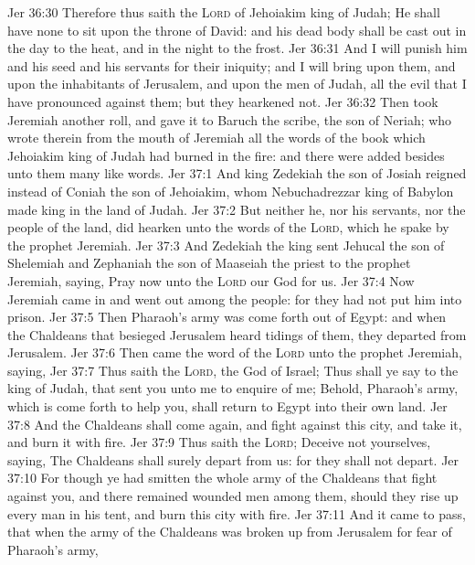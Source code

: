 \vs Jer 36:30 Therefore thus saith the \textsc{Lord} of Jehoiakim king of Judah; He shall have none to sit upon the throne of David: and his dead body shall be cast out in the day to the heat, and in the night to the frost.
\vs Jer 36:31 And I will punish him and his seed and his servants for their iniquity; and I will bring upon them, and upon the inhabitants of Jerusalem, and upon the men of Judah, all the evil that I have pronounced against them; but they hearkened not.
\vs Jer 36:32 Then took Jeremiah another roll, and gave it to Baruch the scribe, the son of Neriah; who wrote therein from the mouth of Jeremiah all the words of the book which Jehoiakim king of Judah had burned in the fire: and there were added besides unto them many like words.
\vs Jer 37:1 And king Zedekiah the son of Josiah reigned instead of Coniah the son of Jehoiakim, whom Nebuchadrezzar king of Babylon made king in the land of Judah.
\vs Jer 37:2 But neither he, nor his servants, nor the people of the land, did hearken unto the words of the \textsc{Lord}, which he spake by the prophet Jeremiah.
\vs Jer 37:3 And Zedekiah the king sent Jehucal the son of Shelemiah and Zephaniah the son of Maaseiah the priest to the prophet Jeremiah, saying, Pray now unto the \textsc{Lord} our God for us.
\vs Jer 37:4 Now Jeremiah came in and went out among the people: for they had not put him into prison.
\vs Jer 37:5 Then Pharaoh's army was come forth out of Egypt: and when the Chaldeans that besieged Jerusalem heard tidings of them, they departed from Jerusalem.
\vs Jer 37:6 Then came the word of the \textsc{Lord} unto the prophet Jeremiah, saying,
\vs Jer 37:7 Thus saith the \textsc{Lord}, the God of Israel; Thus shall ye say to the king of Judah, that sent you unto me to enquire of me; Behold, Pharaoh's army, which is come forth to help you, shall return to Egypt into their own land.
\vs Jer 37:8 And the Chaldeans shall come again, and fight against this city, and take it, and burn it with fire.
\vs Jer 37:9 Thus saith the \textsc{Lord}; Deceive not yourselves, saying, The Chaldeans shall surely depart from us: for they shall not depart.
\vs Jer 37:10 For though ye had smitten the whole army of the Chaldeans that fight against you, and there remained  wounded men among them,  should they rise up every man in his tent, and burn this city with fire.
\vs Jer 37:11 And it came to pass, that when the army of the Chaldeans was broken up from Jerusalem for fear of Pharaoh's army,
